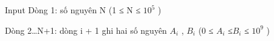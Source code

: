 Input
Dòng 1: số nguyên N (1 ≤ N ≤ $10^{5}$ )

Dòng 2…N+1: dòng i + 1 ghi hai số nguyên $A_{i}$ , $B_{i}$ (0 ≤ $A_{i}$ ≤$B_{i}$ ≤ $10^{9}$ )
